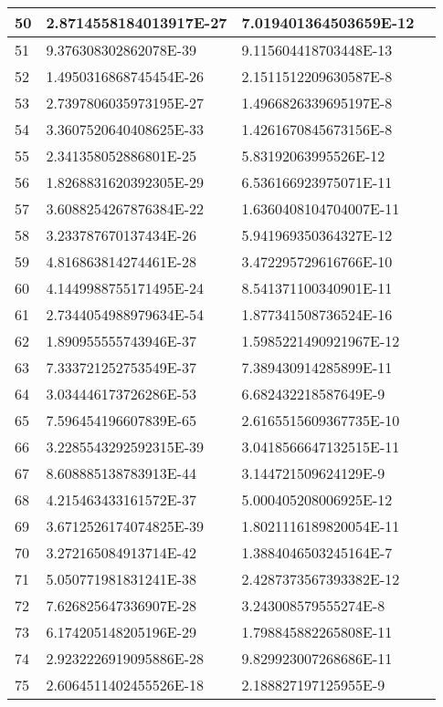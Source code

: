 \begin{center}
\begin{longtable}{ | l | l | l | l |}
50 &	2.8714558184013917E-27 &	7.019401364503659E-12 \\ \hline
51 &	9.376308302862078E-39 &	9.115604418703448E-13 \\ \hline
52 &	1.4950316868745454E-26 &	2.1511512209630587E-8 \\ \hline
53 &	2.7397806035973195E-27 &	1.4966826339695197E-8 \\ \hline
54 &	3.3607520640408625E-33 &	1.4261670845673156E-8 \\ \hline
55 &	2.341358052886801E-25 &	5.83192063995526E-12 \\ \hline
56 &	1.8268831620392305E-29 &	6.536166923975071E-11 \\ \hline
57 &	3.6088254267876384E-22 &	1.6360408104704007E-11 \\ \hline
58 &	3.233787670137434E-26 &	5.941969350364327E-12 \\ \hline
59 &	4.816863814274461E-28 &	3.472295729616766E-10 \\ \hline
60 &	4.1449988755171495E-24 &	8.541371100340901E-11 \\ \hline
61 &	2.7344054988979634E-54 &	1.877341508736524E-16 \\ \hline
62 &	1.890955555743946E-37 &	1.5985221490921967E-12 \\ \hline
63 &	7.333721252753549E-37 &	7.389430914285899E-11 \\ \hline
64 &	3.034446173726286E-53 &	6.682432218587649E-9 \\ \hline
65 &	7.596454196607839E-65 &	2.6165515609367735E-10 \\ \hline
66 &	3.2285543292592315E-39 &	3.0418566647132515E-11 \\ \hline
67 &	8.608885138783913E-44 &	3.144721509624129E-9 \\ \hline
68 &	4.215463433161572E-37 &	5.000405208006925E-12 \\ \hline
69 &	3.6712526174074825E-39 &	1.8021116189820054E-11 \\ \hline
70 &	3.272165084913714E-42 &	1.3884046503245164E-7 \\ \hline
71 &	5.050771981831241E-38 &	2.4287373567393382E-12 \\ \hline
72 &	7.626825647336907E-28 &	3.243008579555274E-8 \\ \hline
73 &	6.174205148205196E-29 &	1.798845882265808E-11 \\ \hline
74 &	2.9232226919095886E-28 &	9.829923007268686E-11 \\ \hline
75 &	2.6064511402455526E-18 &	2.188827197125955E-9 \\ \hline

\end{longtable}
\end{center}
